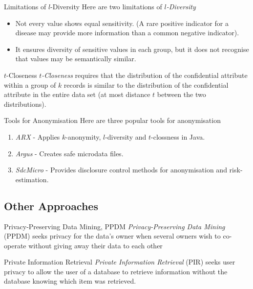 \documentclass[11pt,a4paper]{article}
\begin{document}
  \begin{proposition}{Limitations of $l$-Diversity}
    Here are two limitations of \textit{$l$-Diversity}
    \begin{itemize}
      \item Not every value shows equal sensitivity. (A rare positive indicator for a disease may provide more information than a common negative indicator).
      \item It ensures diversity of sensitive values in each group, but it does not recognise that values may be semantically similar.
    \end{itemize}
  \end{proposition}

  \begin{definition}{$t$-Closeness}
    \textit{$t$-Closeness} requires that the distribution of the confidential attribute within a group of $k$ records is similar to the distribution of the confidential attribute in the entire data set (at most distance $t$ between the two distributions).
  \end{definition}

  \begin{remark}{Tools for Anonymisation}
    Here are three popular tools for anonymisation
    \begin{enumerate}
      \item \textit{ARX} - Applies $k$-anonymity, $l$-diversity and $t$-clossness in Java.
      \item \textit{Argus} - Creates safe microdata files.
      \item \textit{SdcMicro} - Provides disclosure control methods for anonymisation and risk-estimation.
    \end{enumerate}
  \end{remark}

\subsection{Other Approaches}

  \begin{definition}{Privacy-Preserving Data Mining, PPDM}
    \textit{Privacy-Preserving Data Mining} (PPDM) seeks privacy for the data's owner when several owners wish to co-operate without giving away their data to each other
  \end{definition}

  \begin{definition}{Private Information Retrieval}
    \textit{Private Information Retrieval} (PIR) seeks user privacy to allow the user of a database to retrieve information without the database knowing which item was retrieved.
  \end{definition}
\end{document}
